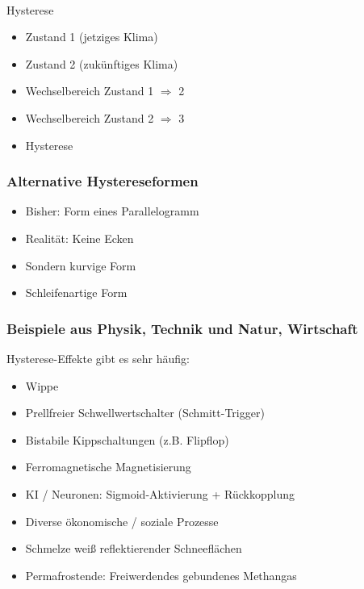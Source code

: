 \documentclass{beamer}
\newcommand{\imply}{$\Rightarrow$}
\begin{document}
\begin{frame}
{{{
      }
    }
  }
  \vspace{-3.5cm}\\
  Hysterese
  \begin{itemize}
    \item<2->  Zustand 1 (\glqq{}jetziges Klima\grqq)
    \item<3->  Zustand 2 (\glqq{}zukünftiges Klima\grqq)
    \item<4->  Wechselbereich Zustand 1 {\imply} 2
    \item<5->  Wechselbereich Zustand 2 {\imply} 3
    \item<6->  \glqq{}Hysterese\grqq
  \end{itemize}
\end{frame}

\begin{frame}
  \frametitle{Alternative Hystereseformen}
  \begin{itemize}
    \item<1->  Bisher: Form eines Parallelogramm
    \item<2->  Realität: Keine Ecken
    \item<3->  Sondern kurvige Form
    \item<4->  Schleifenartige Form
  \end{itemize}
\end{frame}

\begin{frame}
  \frametitle{Beispiele aus Physik, Technik und Natur, Wirtschaft}
  Hysterese-Effekte gibt es sehr häufig:
  \begin{itemize}
    \item<2->  Wippe
    \item<3->  Prellfreier Schwellwertschalter (Schmitt-Trigger)
    \item<4->  Bistabile Kippschaltungen (z.B. Flipflop)
    \item<5->  Ferromagnetische Magnetisierung
    \item<5->  KI / Neuronen: Sigmoid-Aktivierung + Rückkopplung
    \item<6->  Diverse ökonomische / soziale Prozesse
    \item<7->  Schmelze weiß reflektierender Schneeflächen
    \item<8->  Permafrostende: Freiwerdendes gebundenes Methangas
  \end{itemize}
\end{frame}
\end{document}
